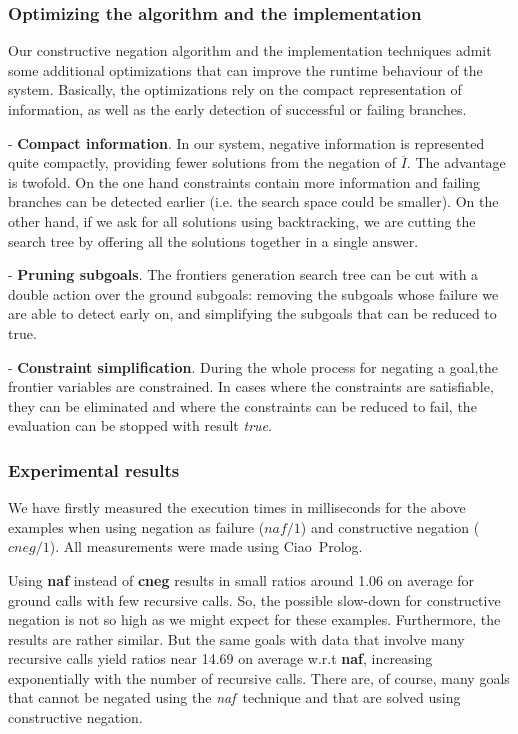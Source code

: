 \documentclass{llncs}
\newcommand{\naf}{{\em naf}}\newcommand{\viejo}[1]{}
\newcommand{\ciao}{Ciao}
\begin{document}
\subsubsection{Optimizing the algorithm and the implementation}
\label{optimization}

Our constructive negation algorithm and the implementation techniques
admit some additional optimizations that can improve the runtime
behaviour of the system. Basically, the optimizations rely on the
compact representation of information, as well as the early detection
of successful or failing branches.

\noindent
- {\bf Compact information}. In our system, negative information is
represented quite compactly, providing fewer solutions from the
negation of $\overline{I}$. The advantage is twofold. On the one hand
constraints contain more information and failing branches can be
detected earlier (i.e. the search space could be smaller). On the
other hand, if we ask for all solutions using backtracking, we are
cutting the search tree by offering all the solutions together in a
single answer.

\noindent
- {\bf Pruning subgoals}. The frontiers generation search tree can be
cut with a double action over the ground subgoals: removing the
subgoals whose failure we are able to detect early on, and simplifying the
subgoals that can be reduced to true.

\noindent
- {\bf Constraint simplification}. During the whole process for negating
a goal,the frontier variables are constrained. In cases where the
constraints are satisfiable, they can be eliminated and where the
constraints can be reduced to fail, the evaluation can be stopped with
result \emph{true}.
 

\subsubsection{Experimental results}
We have firstly measured the execution times in milliseconds for the
above examples when using negation as failure ($naf/1$) and
constructive negation ($cneg/1$). All measurements were made using \ciao\
Prolog.

Using {\bf naf} instead of {\bf cneg} results in small ratios around
1.06 on average for ground calls with few recursive calls. So, the
possible slow-down for constructive negation is not so high as we
might expect for these examples. Furthermore, the results are rather
similar. But the same goals with data that involve many recursive
calls yield ratios near 14.69 on average w.r.t {\bf naf},
increasing exponentially with the number of recursive calls. There
are, of course, many goals that cannot be negated using the \naf\
technique and that are solved using constructive negation.
\end{document}
